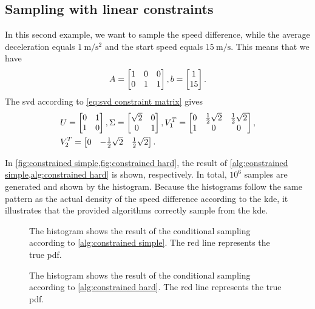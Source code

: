 \subsection{Sampling with linear constraints}

In this second example, we want to sample the speed difference, while the average deceleration equals $\SI{1}{\meter\per\second\squared}$ and the start speed equals $\SI{15}{\meter\per\second}$. 
This means that we have
\begin{equation*}
	A = \begin{bmatrix} 1 & 0 & 0 \\ 0 & 1 & 1 \end{bmatrix}, 
	b = \begin{bmatrix} 1 \\ 15 \end{bmatrix}.
\end{equation*}
The \ac{svd} according to \cref{eq:svd constraint matrix} gives
\begin{align*}
	&U = \begin{bmatrix} 0 & 1 \\ 1 & 0 \end{bmatrix},
	\Sigma = \begin{bmatrix} \sqrt{2} & 0 \\ 0 & 1 \end{bmatrix}, 
	V_1^T = \begin{bmatrix} 0 & \frac{1}{2}\sqrt{2} & \frac{1}{2}\sqrt{2} \\ 1 & 0 & 0 \end{bmatrix},\\
	&V_2^T = \begin{bmatrix} 0 & -\frac{1}{2}\sqrt{2} & \frac{1}{2}\sqrt{2} \end{bmatrix}.
\end{align*}

In \cref{fig:constrained simple,fig:constrained hard}, the result of \cref{alg:constrained simple,alg:constrained hard} is shown, respectively. 
In total, $10^6$ samples are generated and shown by the histogram. 
Because the histograms follow the same pattern as the actual density of the speed difference according to the \ac{kde}, it illustrates that the provided algorithms correctly sample from the \ac{kde}. 

\begin{figure}
	\figurevspace
	\centering
	\resizebox{\columnwidth}{!}{%
		
	}
	\captionvspace
	\caption{The histogram shows the result of the conditional sampling according to \cref{alg:constrained simple}. The red line represents the true \ac{pdf}.}
	\label{fig:constrained simple}
\end{figure}

\begin{figure}
	\figurevspace
	\centering
	\resizebox{\columnwidth}{!}{%
		
	}
	\captionvspace
	\caption{The histogram shows the result of the conditional sampling according to \cref{alg:constrained hard}. The red line represents the true \ac{pdf}.}
	\label{fig:constrained hard}
\end{figure}

